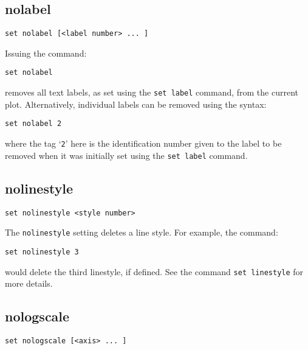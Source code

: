 \documentclass[a4paper,onecolumn,11pt]{book}
\begin{document}
\subsection{nolabel}

\begin{verbatim}
set nolabel [<label number> ... ]
\end{verbatim}

Issuing the command:

\begin{verbatim}
set nolabel
\end{verbatim}

\noindent removes all text labels, as set using the {\tt set label} command,
from the current plot. Alternatively, individual labels can be removed using
the syntax:

\begin{verbatim}
set nolabel 2
\end{verbatim}

\noindent where the tag `{\tt 2}' here is the identification number given to
the label to be removed when it was initially set using the {\tt set label}
command.

\subsection{nolinestyle}

\begin{verbatim}
set nolinestyle <style number>
\end{verbatim}

The {\tt nolinestyle} setting deletes a line style. For example, the command:

\begin{verbatim}
set nolinestyle 3
\end{verbatim}

\noindent would delete the third linestyle, if defined. See the command {\tt set
linestyle} for more details.


\subsection{nologscale}

\begin{verbatim}
set nologscale [<axis> ... ]
\end{verbatim}
\end{document}
